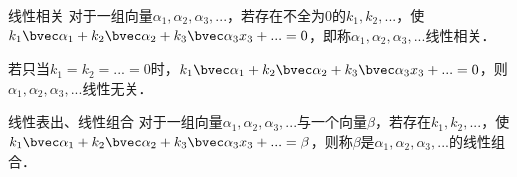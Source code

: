 
\begin{theorem}{线性相关}
对于一组向量$\alpha_1, \alpha_2,\alpha_3,...$，若存在不全为0的$k_1,k_2,...$，使$k_1 \bvec \alpha_1+k_2 \bvec \alpha_2+k_3 \bvec \alpha_3 x_3+...=0$，即称$\alpha_1, \alpha_2,\alpha_3,...$线性相关．

若只当$k_1=k_2=...=0$时，$k_1 \bvec \alpha_1+k_2 \bvec \alpha_2+k_3 \bvec \alpha_3 x_3+...=0$，则$\alpha_1, \alpha_2,\alpha_3,...$线性无关．
\end{theorem}

\begin{theorem}{线性表出、线性组合}
对于一组向量$\alpha_1, \alpha_2,\alpha_3,...$与一个向量$\beta$，若存在$k_1,k_2,...$，使$k_1 \bvec \alpha_1+k_2 \bvec \alpha_2+k_3 \bvec \alpha_3 x_3+...=\beta$，则称$\beta$是$\alpha_1, \alpha_2,\alpha_3,...$的线性组合．
\end{theorem}
